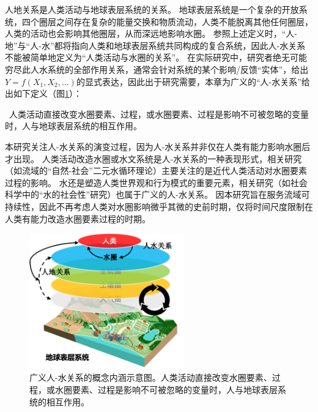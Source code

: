 人地关系是人类活动与地球表层系统的关系\cite{wu1991,li2016d}。
地球表层系统是一个复杂的开放系统，四个圈层之间存在复杂的能量交换和物质流动，人类不能脱离其他任何圈层，人类的活动也会影响其他圈层，从而深远地影响水圈。
参照上述定义时，“人-地”与“人-水”都将指向人类和地球表层系统共同构成的复合系统，因此人-水关系不能被简单地定义为“人类活动与水圈的关系”。
在实际研究中，研究者绝无可能穷尽此人水系统的全部作用关系，通常会针对系统的某个影响/反馈“实体”，给出$Y = f(X_1, X_2, \dots)$的显式表达，因此出于研究需要，本章为广义的“人-水关系”给出如下定义（图\ref{ch2:fig:definitions}）：

{\kai~人类活动直接改变水圈要素、过程，或水圈要素、过程是影响不可被忽略的变量时，人与地球表层系统的相互作用。}

本研究关注人-水关系的演变过程，因为人-水关系并非仅在人类有能力影响水圈后才出现。
人类活动改造水圈或水文系统是人-水关系的一种表现形式，相关研究（如流域的“自然-社会”二元水循环理论）主要关注的是近代人类活动对水圈要素过程的影响\cite{wang2006, wang2016}。
水还是塑造人类世界观和行为模式的重要元素，相关研究（如社会科学中的“水的社会性”研究）也属于广义的人-水关系。
因本研究旨在服务流域可持续性，因此不再考虑人类对水圈影响微乎其微的史前时期，仅将时间尺度限制在人类有能力改造水圈要素过程的时期。

\begin{figure}[!htb]
    \centering
    \includegraphics[width=0.6\textwidth]{img/ch2/ch2_scope.png}
    \caption[广义人-水关系的概念内涵示意图]{广义人-水关系的概念内涵示意图。人类活动直接改变水圈要素、过程，或水圈要素、过程是影响不可被忽略的变量时，人与地球表层系统的相互作用。}\label{ch2:fig:definitions}
\end{figure}


